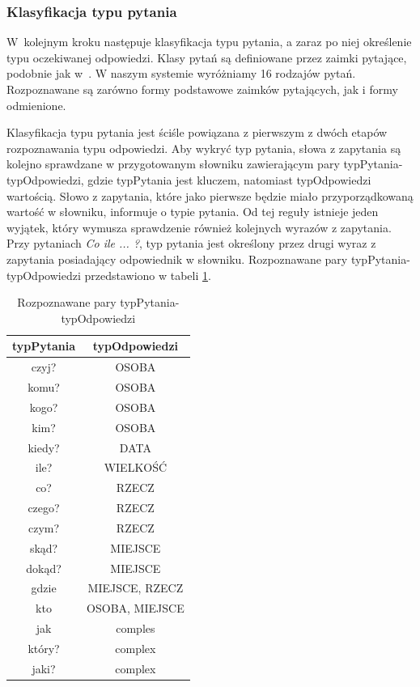 \subsubsection{Klasyfikacja typu pytania}
W~kolejnym kroku następuje klasyfikacja typu pytania, a zaraz po niej określenie typu oczekiwanej odpowiedzi. Klasy pytań są definiowane przez zaimki pytające, podobnie jak w~\cite{gupta2012survey}. W naszym systemie wyróżniamy 16 rodzajów pytań. Rozpoznawane są zarówno formy podstawowe zaimków pytających, jak i formy odmienione.

Klasyfikacja typu pytania jest ściśle powiązana z pierwszym z dwóch etapów rozpoznawania typu odpowiedzi. Aby wykryć typ pytania, słowa z zapytania są kolejno sprawdzane w przygotowanym słowniku zawierającym pary typPytania-typOdpowiedzi, gdzie typPytania jest kluczem, natomiast typOdpowiedzi wartością. Słowo z zapytania, które jako pierwsze będzie miało przyporządkowaną wartość w słowniku, informuje o typie pytania. Od tej reguły istnieje jeden wyjątek, który wymusza sprawdzenie również kolejnych wyrazów z zapytania. Przy pytaniach \emph{Co ile ... ?}, typ pytania jest określony przez drugi wyraz z zapytania posiadający odpowiednik w słowniku. Rozpoznawane pary typPytania-typOdpowiedzi przedstawiono w tabeli \ref{tab:tabelaPytOdp}.

\begin{table}[h]
	\centering
	\begin{tabular}{|c|c| }
		
		 \hline
		\textbf{typPytania} & \textbf{typOdpowiedzi}  \\ \hline
		czyj? & OSOBA \\  \hline
		komu? & OSOBA \\ \hline
		kogo? & OSOBA \\ \hline
		kim? & OSOBA \\ \hline
		kiedy? & DATA \\  \hline
		ile? & WIELKOŚĆ \\  \hline
		co? & RZECZ \\  \hline
		czego? & RZECZ \\ \hline
		czym? & RZECZ \\ \hline
		skąd? & MIEJSCE \\ \hline
		dokąd? & MIEJSCE \\ \hline
		gdzie & MIEJSCE, RZECZ \\ \hline
		kto & OSOBA, MIEJSCE \\ \hline
		jak & comples \\ \hline
		który? & complex \\ \hline
		jaki? & complex  \\  \hline
	\end{tabular}
	\caption{Rozpoznawane pary typPytania-typOdpowiedzi}

\label{tab:tabelaPytOdp}

\end{table}

